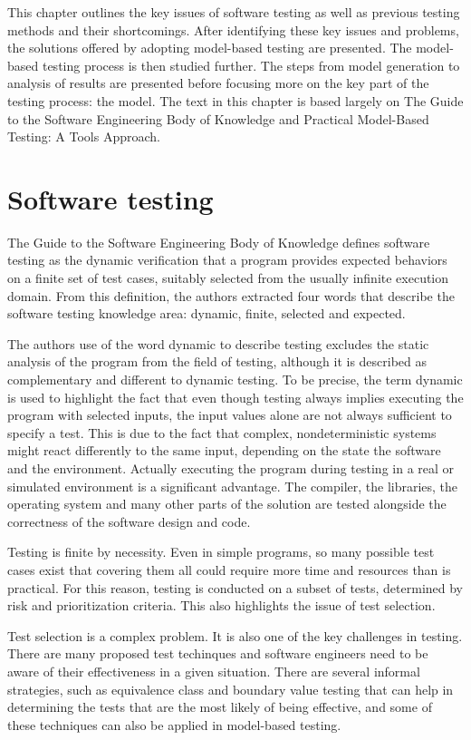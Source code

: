 This chapter outlines the key issues of software testing as well as previous testing methods and their shortcomings.
After identifying these key issues and problems, the solutions offered by adopting model-based testing are presented.
The model-based testing process is then studied further. The steps from model generation to analysis of results are presented 
before focusing more on the key part of the testing process: the model. The text in this chapter is based largely on The Guide to the Software Engineering Body of Knowledge \cite{swebok} and Practical Model-Based Testing: A Tools Approach. \cite{tools}

\section{Software testing}
The Guide to the Software Engineering Body of Knowledge defines software testing as the dynamic verification that a program provides expected behaviors on a finite set of test cases, suitably selected from the usually infinite execution domain. From this definition, the authors extracted four words that describe the software testing knowledge area: dynamic, finite, selected and expected.

The authors use of the word dynamic to describe testing excludes the static analysis of the program from the field of testing, although it is described as complementary and different to dynamic testing. To be precise, the term dynamic is used to highlight the fact that even though testing always implies executing the program with selected inputs, the input values alone are not always sufficient to specify a test. This is due to the fact that complex, nondeterministic systems might react differently to the same input, depending on the state the software and the environment.
Actually executing the program during testing in a real or simulated environment is a significant advantage. The compiler, the libraries, the operating system and many other parts of the solution are tested alongside the correctness of the software design and code.

Testing is finite by necessity. Even in simple programs, so many possible test cases exist that covering them all could require more time and resources than is practical. For this reason, testing is conducted on a subset of tests, determined by risk and prioritization criteria. This also highlights the issue of test selection.

Test selection is a complex problem. It is also one of the key challenges in testing. There are many proposed test techinques and software engineers need to be aware of their effectiveness in a given situation. There are several informal strategies, such as equivalence class and boundary value testing that can help in determining the tests that are the most likely of being effective, and some of these techniques can also be applied in model-based testing.

